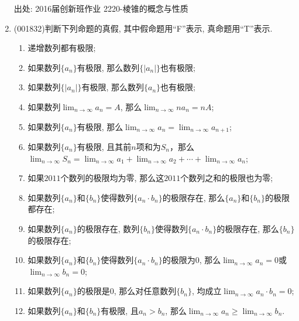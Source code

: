 \documentclass[10pt,a4paper]{article}
\newcommand{\blank}[1]{\underline{\hbox to #1pt{}}}
\begin{document}
\begin{enumerate}[1.]
出处: 2016届创新班作业	2220-棱锥的概念与性质
\item { (001832)}判断下列命题的真假, 其中假命题用``F''表示, 真命题用``T''表示.\\ 
\begin{enumerate}[\blank{20}(1)]
\item 递增数列都有极限;\\ 
\item 如果数列$\{a_n\}$有极限, 那么数列$\{|a_n|\}$也有极限;\\ 
\item 如果数列$\{|a_n|\}$有极限, 那么数列$\{a_n\}$也有极限;\\ 
\item 如果数列$\displaystyle\lim_{n\rightarrow \infty} a_n=A$, 那么$\displaystyle\lim_{n\rightarrow \infty} na_n=nA$;\\ 
\item 如果数列$\{a_n\}$有极限, 那么$\displaystyle\lim_{n\rightarrow \infty} a_n=\displaystyle\lim_{n\rightarrow \infty} a_{n+1}$;\\ 
\item 如果数列$\{a_n\}$有极限, 且其前$n$项和为$S_n$，那么$\displaystyle\lim_{n\rightarrow \infty} S_n=\displaystyle\lim_{n\rightarrow \infty} a_{1}+\displaystyle\lim_{n\rightarrow \infty} a_{2}+\cdots+\displaystyle\lim_{n\rightarrow \infty} a_{n}$;\\ 
\item 如果$2011$个数列的极限均为零, 那么这$2011$个数列之和的极限也为零;\\ 
\item 如果数列$\{a_n\}$和$\{b_n\}$使得数列$\{a_n\cdot b_n\}$的极限存在, 那么$\{a_n\}$和$\{b_n\}$的极限都存在;\\ 
\item 如果数列$\{a_n\}$的极限存在, 数列$\{b_n\}$使得数列$\{a_n\cdot b_n\}$的极限存在, 那么$\{b_n\}$的极限存在;\\ 
\item 如果数列$\{a_n\}$和$\{b_n\}$使得数列$\{a_n\cdot b_n\}$的极限为$0$, 那么$\displaystyle\lim_{n\rightarrow \infty} a_n=0$或$\displaystyle\lim_{n\rightarrow \infty} b_n=0$;\\ 
\item 如果数列$\{a_n\}$的极限是$0$, 那么对任意数列$\{b_n\}$, 均成立$\displaystyle\lim_{n\rightarrow \infty} a_n\cdot b_n=0$;\\ 
\item 如果数列$\{a_n\}$和$\{b_n\}$有极限, 且$a_n>b_n$, 那么$\displaystyle\lim_{n\rightarrow \infty} a_n\geq\displaystyle\lim_{n\rightarrow \infty} b_n$.
\end{enumerate}



\end{enumerate}
\end{document}
